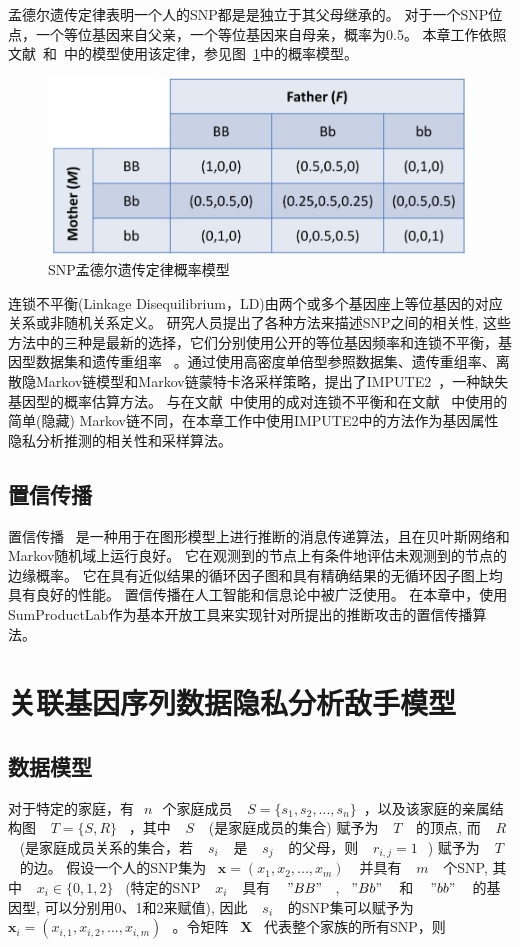 孟德尔遗传定律表明一个人的SNP都是是独立于其父母继承的。 对于一个SNP位点，一个等位基因来自父亲，一个等位基因来自母亲，概率为0.5。 本章工作依照文献~\cite{humbert2013addressing}和~\cite{deznabi2018inference}中的模型使用该定律，参见图~\ref{fig:Mendelian-law}中的概率模型。

\begin{figure}[htbp]
	\centering
	\includegraphics[width=0.6\linewidth]{./figures/Mendelian-law.jpg}
	\centering
	\caption{SNP孟德尔遗传定律概率模型}\label{fig:Mendelian-law}
\end{figure}

连锁不平衡(Linkage Disequilibrium，LD)由两个或多个基因座上等位基因的对应关系或非随机关系定义。 研究人员提出了各种方法来描述SNP之间的相关性, 这些方法中的三种是最新的选择，它们分别使用公开的等位基因频率和连锁不平衡，基因型数据集和遗传重组率~\cite{samani2015quantifying} 。通过使用高密度单倍型参照数据集、遗传重组率、离散隐Markov链模型和Markov链蒙特卡洛采样策略，提出了IMPUTE2~\cite{howie2014impute2}，一种缺失基因型的概率估算方法。 与在文献~\cite{humbert2013addressing,humbert2017quantifying}中使用的成对连锁不平衡和在文献~\cite{deznabi2018inference} 中使用的简单(隐藏) Markov链不同，在本章工作中使用IMPUTE2中的方法作为基因属性隐私分析推测的相关性和采样算法。

\subsection{置信传播}

置信传播~\cite{kschischang2001factor} 是一种用于在图形模型上进行推断的消息传递算法，且在贝叶斯网络和Markov随机域上运行良好。 它在观测到的节点上有条件地评估未观测到的节点的边缘概率。 它在具有近似结果的循环因子图和具有精确结果的无循环因子图上均具有良好的性能。 置信传播在人工智能和信息论中被广泛使用。 在本章中，使用 SumProductLab作为基本开放工具来实现针对所提出的推断攻击的置信传播算法。

\section{关联基因序列数据隐私分析敌手模型}
\subsection{数据模型}
对于特定的家庭，有~$~n~$~个家庭成员 ~$~S=\{s_1,s_2,...,s_n\}$~，以及该家庭的亲属结构图 ~$~T=\{S,R\}$~ ，其中 ~$~S~$~ (是家庭成员的集合) 赋予为 ~$~T~$~ 的顶点, 而 ~$~R~$~ (是家庭成员关系的集合，若 ~$~s_i~$~ 是 ~$~s_j~$~ 的父母，则 ~$~r_{i,j}=1~$~) 赋予为 ~$~T~$~ 的边。 假设一个人的SNP集为 ~$\mathbf{x}=(x_1,x_2,...,x_m)~$~ 并具有 ~$~m~$~ 个SNP, 其中 ~$~x_i \in \{0,1,2\}$~ (特定的SNP ~$~x_i~$~ 具有 ~$~"BB"~$~,~$~"Bb"~$~ 和 ~$~"bb"~$~ 的基因型, 可以分别用0、1和2来赋值), 因此 ~$~s_i~$~ 的SNP集可以赋予为 ~$\mathbf{x}_i=(x_{i,1},x_{i,2},...,x_{i,m})~$~。令矩阵 ~$\mathbf{X}$~ 代表整个家族的所有SNP，则

